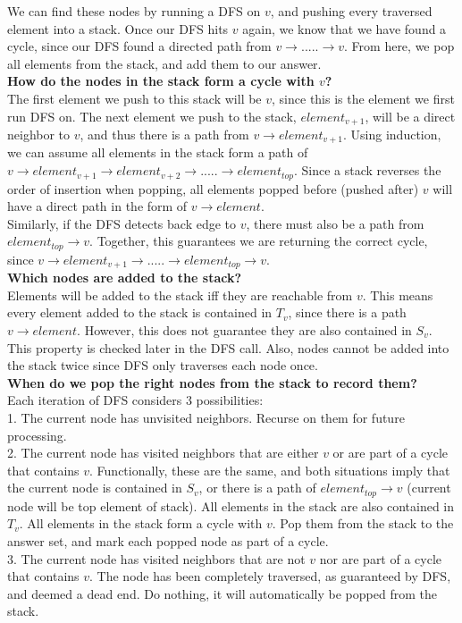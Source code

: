 \documentclass{exam}
\begin{document}
\begin{questions}
We can find these nodes by running a DFS on $v$, and pushing every traversed element into a stack. Once our DFS hits $v$ again, we know that we have found a cycle, since our DFS found a directed path from $v \rightarrow ..... \rightarrow v$. From here, we pop all elements from the stack, and add them to our answer.\\

{\bf How do the nodes in the stack form a cycle with $v$?}\\
The first element we push to this stack will be $v$, since this is the element we first run DFS on. The next element we push to the stack, $element_{v+1}$, will be a direct neighbor to $v$, and thus there is a path from $v \rightarrow element_{v+1}$. Using induction, we can assume all elements in the stack form a path of $v \rightarrow element_{v+1} \rightarrow element_{v+2} \rightarrow ..... \rightarrow element_{top}$. Since a stack reverses the order of insertion when popping, all elements popped before (pushed after) $v$ will have a direct path in the form of $v \rightarrow element$.\\

Similarly, if the DFS detects back edge to $v$, there must also be a path from $element_{top} \rightarrow v$. Together, this guarantees we are returning the correct cycle, since $v \rightarrow element_{v+1} \rightarrow ..... \rightarrow element_{top} \rightarrow v$.\\

{\bf Which nodes are added to the stack?}\\
Elements will be added to the stack iff they are reachable from $v$. This means every element added to the stack is contained in $T_v$, since there is a path $v \rightarrow element$. However, this does not guarantee they are also contained in $S_v$. This property is checked later in the DFS call. Also, nodes cannot be added into the stack twice since DFS only traverses each node once.\\

{\bf When do we pop the right nodes from the stack to record them?}\\
Each iteration of DFS considers 3 possibilities:\\
1. The current node has unvisited neighbors. Recurse on them for future processing.\\
2. The current node has visited neighbors that are either $v$ or are part of a cycle that contains $v$. Functionally, these are the same, and both situations imply that the current node is contained in $S_v$, or there is a path of $element_{top} \rightarrow v$ (current node will be top element of stack). All elements in the stack are also contained in $T_v$. All elements in the stack form a cycle with $v$. Pop them from the stack to the answer set, and mark each popped node as part of a cycle.\\
3. The current node has visited neighbors that are not $v$ nor are part of a cycle that contains $v$. The node has been completely traversed, as guaranteed by DFS, and deemed a dead end. Do nothing, it will automatically be popped from the stack.\\


\end{questions}
\end{document}
